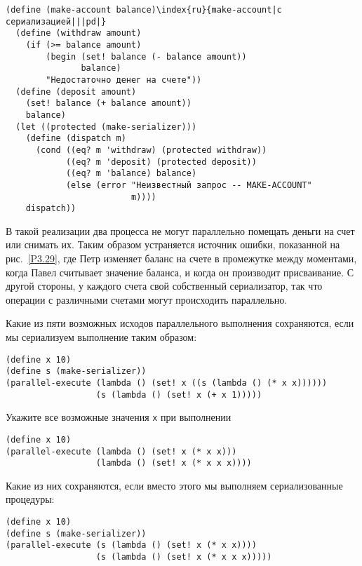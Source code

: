 \begin{Verbatim}[fontsize=\small]
(define (make-account balance)\index{ru}{make-account|с сериализацией|||pd|}
  (define (withdraw amount)
    (if (>= balance amount)
        (begin (set! balance (- balance amount))
               balance)
        "Недостаточно денег на счете"))
  (define (deposit amount)
    (set! balance (+ balance amount))
    balance)
  (let ((protected (make-serializer)))
    (define (dispatch m)
      (cond ((eq? m 'withdraw) (protected withdraw))
            ((eq? m 'deposit) (protected deposit))
            ((eq? m 'balance) balance)
            (else (error "Неизвестный запрос -- MAKE-ACCOUNT"
                         m))))
    dispatch))
\end{Verbatim}
В такой реализации два процесса не могут параллельно помещать деньги
на счет или снимать их.  Таким образом устраняется источник ошибки,
показанной на рис.~\ref{P3.29}, где Петр изменяет баланс
на счете в промежутке между моментами, когда Павел считывает значение
баланса, и когда он производит присваивание.  С другой стороны, у
каждого счета свой собственный сериализатор, так что операции с
различными счетами могут происходить параллельно.
\begin{exercise}{3.39}\label{EX3.39}%
Какие из пяти возможных исходов параллельного
выполнения сохраняются, если мы сериализуем выполнение таким образом:

\begin{Verbatim}[fontsize=\small]
(define x 10)
(define s (make-serializer))
(parallel-execute (lambda () (set! x ((s (lambda () (* x x))))))
                  (s (lambda () (set! x (+ x 1)))))
\end{Verbatim}
\end{exercise}
\begin{exercise}{3.40}\label{EX3.40}%
Укажите все возможные значения {\tt x} при
выполнении

\begin{Verbatim}[fontsize=\small]
(define x 10)
(parallel-execute (lambda () (set! x (* x x)))
                  (lambda () (set! x (* x x x))))
\end{Verbatim}
Какие из них сохраняются, если вместо этого мы выполняем
сериализованные процедуры:

\begin{Verbatim}[fontsize=\small]
(define x 10)
(define s (make-serializer))
(parallel-execute (s (lambda () (set! x (* x x))))
                  (s (lambda () (set! x (* x x x)))))
\end{Verbatim}
\end{exercise}
